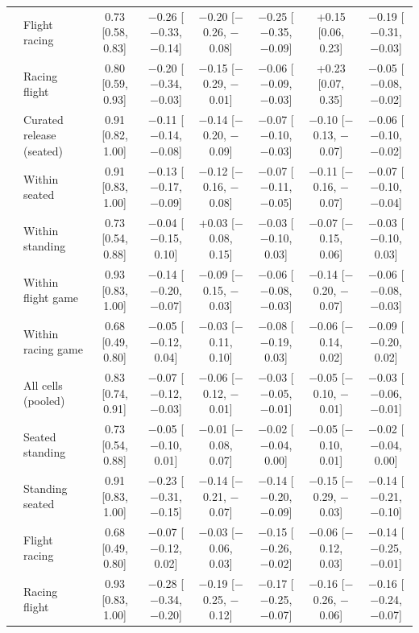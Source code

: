 \begin{table}[ht]
\begin{tabular}{@{}llcccccc@{}}
 & Flight \ra{} racing & 0.73 [0.58, 0.83] & $-$0.26 [$-$0.33, $-$0.14] & $-$0.20 [$-$0.26, $-$0.08] & $-$0.25 [$-$0.35, $-$0.09] & +0.15 [0.06, 0.23] & $-$0.19 [$-$0.31, $-$0.03] \\
 & Racing \ra{} flight & 0.80 [0.59, 0.93] & $-$0.20 [$-$0.34, $-$0.03] & $-$0.15 [$-$0.29, $-$0.01] & $-$0.06 [$-$0.09, $-$0.03] & +0.23 [0.07, 0.35] & $-$0.05 [$-$0.08, $-$0.02] \\
\midrule
\sevone{} & Curated release (seated) & 0.91 [0.82, 1.00] & $-$0.11 [$-$0.14, $-$0.08] & $-$0.14 [$-$0.20, $-$0.09] & $-$0.07 [$-$0.10, $-$0.03] & $-$0.10 [$-$0.13, $-$0.07] & $-$0.06 [$-$0.10, $-$0.02] \\
 & Within seated & 0.91 [0.83, 1.00] & $-$0.13 [$-$0.17, $-$0.09] & $-$0.12 [$-$0.16, $-$0.08] & $-$0.07 [$-$0.11, $-$0.05] & $-$0.11 [$-$0.16, $-$0.07] & $-$0.07 [$-$0.10, $-$0.04] \\
 & Within standing & 0.73 [0.54, 0.88] & $-$0.04 [$-$0.15, 0.10] & +0.03 [$-$0.08, 0.15] & $-$0.03 [$-$0.10, 0.03] & $-$0.07 [$-$0.15, 0.06] & $-$0.03 [$-$0.10, 0.03] \\
 & Within flight game & 0.93 [0.83, 1.00] & $-$0.14 [$-$0.20, $-$0.07] & $-$0.09 [$-$0.15, $-$0.03] & $-$0.06 [$-$0.08, $-$0.03] & $-$0.14 [$-$0.20, $-$0.07] & $-$0.06 [$-$0.08, $-$0.03] \\
 & Within racing game & 0.68 [0.49, 0.80] & $-$0.05 [$-$0.12, 0.04] & $-$0.03 [$-$0.11, 0.10] & $-$0.08 [$-$0.19, 0.03] & $-$0.06 [$-$0.14, 0.02] & $-$0.09 [$-$0.20, 0.02] \\
 & All cells (pooled) & 0.83 [0.74, 0.91] & $-$0.07 [$-$0.12, $-$0.03] & $-$0.06 [$-$0.12, $-$0.01] & $-$0.03 [$-$0.05, $-$0.01] & $-$0.05 [$-$0.10, $-$0.01] & $-$0.03 [$-$0.06, $-$0.01] \\
 & Seated \ra{} standing & 0.73 [0.54, 0.88] & $-$0.05 [$-$0.10, 0.01] & $-$0.01 [$-$0.08, 0.07] & $-$0.02 [$-$0.04, 0.00] & $-$0.05 [$-$0.10, 0.01] & $-$0.02 [$-$0.04, 0.00] \\
 & Standing \ra{} seated & 0.91 [0.83, 1.00] & $-$0.23 [$-$0.31, $-$0.15] & $-$0.14 [$-$0.21, $-$0.07] & $-$0.14 [$-$0.20, $-$0.09] & $-$0.15 [$-$0.29, $-$0.03] & $-$0.14 [$-$0.21, $-$0.10] \\
 & Flight \ra{} racing & 0.68 [0.49, 0.80] & $-$0.07 [$-$0.12, 0.02] & $-$0.03 [$-$0.06, 0.03] & $-$0.15 [$-$0.26, $-$0.02] & $-$0.06 [$-$0.12, 0.03] & $-$0.14 [$-$0.25, $-$0.01] \\
 & Racing \ra{} flight & 0.93 [0.83, 1.00] & $-$0.28 [$-$0.34, $-$0.20] & $-$0.19 [$-$0.25, $-$0.12] & $-$0.17 [$-$0.25, $-$0.07] & $-$0.16 [$-$0.26, $-$0.06] & $-$0.16 [$-$0.24, $-$0.07] \\
\bottomrule
\end{tabular}
\end{table}